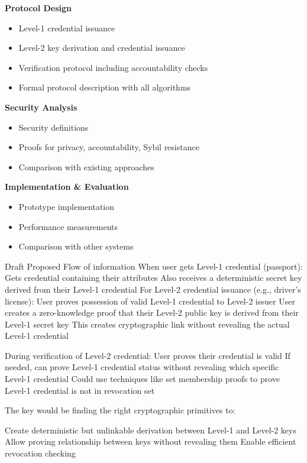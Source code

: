 \noindent \textbf{Protocol Design}
\begin{itemize}
    \item Level-1 credential issuance
    \item Level-2 key derivation and credential issuance
    \item Verification protocol including accountability checks
    \item Formal protocol description with all algorithms
\end{itemize}


\noindent \textbf{Security Analysis}
\begin{itemize}
    \item Security definitions
    \item Proofs for privacy, accountability, Sybil resistance
    \item Comparison with existing approaches
\end{itemize}


\noindent \textbf{Implementation \& Evaluation}
\begin{itemize}
    \item Prototype implementation
    \item Performance measurements
    \item Comparison with other systems
\end{itemize}


Draft Proposed Flow of information
When user gets Level-1 credential (passport):
Gets credential containing their attributes
Also receives a deterministic secret key derived from their Level-1 credential
For Level-2 credential issuance (e.g., driver's license):
User proves possession of valid Level-1 credential to Level-2 issuer
User creates a zero-knowledge proof that their Level-2 public key is derived from their Level-1 secret key
This creates cryptographic link without revealing the actual Level-1 credential


During verification of Level-2 credential:
User proves their credential is valid
If needed, can prove Level-1 credential status without revealing which specific Level-1 credential
Could use techniques like set membership proofs to prove Level-1 credential is not in revocation set

The key would be finding the right cryptographic primitives to:

Create deterministic but unlinkable derivation between Level-1 and Level-2 keys
Allow proving relationship between keys without revealing them
Enable efficient revocation checking


